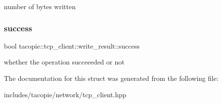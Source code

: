 number of bytes written \mbox{\label{structtacopie_1_1tcp__client_1_1write__result_a4a8d5706c83068a97c10e63c6080e6a3}} 
\subsubsection{\texorpdfstring{success}{success}}
{\footnotesize\ttfamily bool tacopie\+::tcp\+\_\+client\+::write\+\_\+result\+::success}

whether the operation succeeeded or not 

The documentation for this struct was generated from the following file\+:\begin{DoxyCompactItemize}
\item 
includes/tacopie/network/tcp\+\_\+client.\+hpp\end{DoxyCompactItemize}
